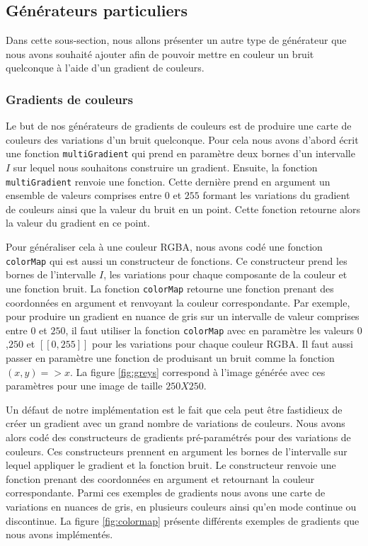 \documentclass[11pt]{article}
\begin{document}
\subsection{Générateurs particuliers}

Dans cette sous-section, nous allons présenter un autre type de générateur que nous avons souhaité ajouter afin de pouvoir mettre en couleur un bruit quelconque à l'aide d'un gradient de couleurs.

\subsubsection{Gradients de couleurs}

Le but de nos générateurs de gradients de couleurs est de produire une carte de couleurs des variations d'un bruit quelconque. Pour cela nous avons d'abord écrit une fonction \texttt{multiGradient} qui prend en paramètre deux bornes d'un intervalle $I$ sur lequel nous souhaitons construire un gradient. Ensuite, la fonction \texttt{multiGradient} renvoie une fonction. Cette dernière prend en argument un ensemble de valeurs comprises entre $0$ et $255$ formant les variations du gradient de couleurs ainsi que la valeur du bruit en un point. Cette fonction retourne alors la valeur du gradient en ce point. 

Pour généraliser cela à une couleur RGBA, nous avons codé une fonction \texttt{colorMap} qui est aussi un constructeur de fonctions. Ce constructeur prend les bornes de l'intervalle $I$, les variations pour chaque composante de la couleur et une fonction bruit. La fonction \texttt{colorMap} retourne une fonction prenant des coordonnées en argument et renvoyant la couleur correspondante. Par exemple, pour produire un gradient en nuance de gris sur un intervalle de valeur comprises entre $0$ et $250$, il faut utiliser la fonction \texttt{colorMap} avec en paramètre les valeurs $0$,$250$ et $[[0,255]]$ pour les variations pour chaque couleur RGBA. Il faut aussi passer en paramètre une fonction de produisant un bruit comme la fonction $(x,y)=>x$. La figure \ref{fig:greys} correspond à l'image générée avec ces paramètres pour une image de taille $250X250$.

Un défaut de notre implémentation est le fait que cela peut être fastidieux de créer un gradient avec un grand nombre de variations de couleurs. Nous avons alors codé des constructeurs de gradients pré-paramétrés pour des variations de couleurs. Ces constructeurs prennent en argument les bornes de l'intervalle sur lequel appliquer le gradient et la fonction bruit. Le constructeur renvoie une fonction prenant des coordonnées en argument et retournant la couleur correspondante. Parmi ces exemples de gradients nous avons une carte de variations en nuances de gris, en plusieurs couleurs ainsi qu'en mode continue ou discontinue. La figure \ref{fig:colormap} présente différents exemples de gradients que nous avons implémentés.
\end{document}
